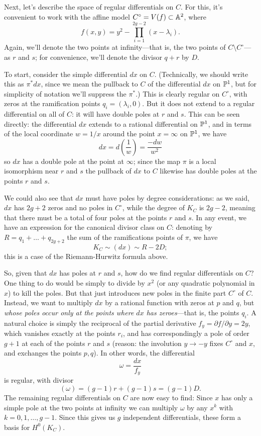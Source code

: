 Next, let's describe the space of regular differentials on $C$. For this, it's convenient to work with the affine model $C^\circ = V(f) \subset \AA^2$, where
$$
f(x,y) = y^2 - \prod_{i=1}^{2g-2} (x - \lambda_i).
$$
Again, we'll denote the two points at infinity---that is, the two points of $C \setminus C^\circ$---as $r$ and $s$; for convenience, we'll denote the divisor $q+r$ by $D$.

To start, consider the simple differential $dx$ on $C$. (Technically, we should write this as $\pi^*dx$, since we mean the pullback to $C$ of the differential $dx$ on $\PP^1$, but for simplicity of notation we'll suppress the $\pi^*$.)  This is clearly regular on $C^\circ$, with zeros at the ramification points $q_i = (\lambda_i, 0)$. But it does not extend to a regular differential on all of $C$: it will have double poles at $r$ and $s$.  This can be seen directly: the differential $dx$ extends to a rational differential on $\PP^1$, and in terms of the local coordinate $w = 1/x$ around the point $x = \infty$ on $\PP^1$, we have
$$
dx = d\left(\frac{1}{w}\right) = \frac{-dw}{w^2}
$$
so $dx$ has a double pole at the point at $\infty$; since the map $\pi$ is a local isomorphism near $r$ and $s$ the pullback of $dx$ to $C$ likewise has double poles at the points $r$ and $s$.


We could also see that $dx$ must have poles by degree considerations: as we said, $dx$ has $2g+2$ zeros and no poles in $C^\circ$, while the degree of $K_C$ is $2g-2$, meaning that there must be  a total of four poles at the points $r$ and $s$. In any event, we have an expression for the canonical divisor class on $C$: denoting by $R = q_1 + \dots + q_{2g+2}$ the sum of the ramifications points of $\pi$, we have
$$
K_C \sim (dx) \sim R - 2D;
$$
this is a case of the Riemann-Hurwitz formula above.

So, given that $dx$ has poles at $r$ and $s$, how do we find regular differentials on $C$? One thing to do would be simply to divide by $x^2$ (or any quadratic polynomial in $x$) to kill the poles. But that just introduces new poles in the finite part $C^\circ$ of $C$. Instead, we want to multiply $dx$ by a rational function with zeros at $p$ and $q$, but \emph{whose poles occur only at the points where $dx$ has zeroes}---that is, the points $q_i$.  A natural choice is simply the reciprocal of the partial derivative $f_y = \partial f/ \partial y = 2y$, which vanishes exactly at the points $r_i$, and has correspondingly a pole of order $g+1$ at each of the points $r$ and $s$ (reason: the involution $y\to -y$ fixes $C^\circ$ and $x$, and exchanges the points $p,q$). In other words, the differential
$$
\omega = \frac{dx}{f_y}
$$
is regular, with divisor
$$
(\omega) = (g-1)r + (g-1)s = (g-1)D.
$$
The remaining regular differentials on $C$ are now easy to find: Since $x$ has only a simple pole
at the two points at infinity we can  multiply $\omega$ by any $x^k$ with $k = 0, 1, \dots, g-1$. Since this gives us $g$ independent differentials, these  form a basis for $H^0(K_C)$.

